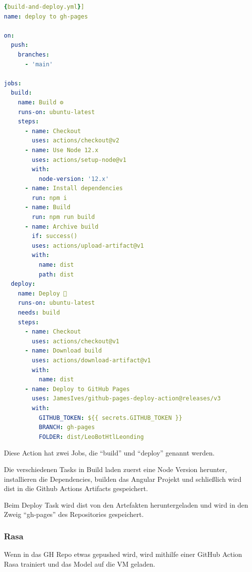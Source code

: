 \begin{lstlisting}[language=yaml,label={lst:buildanddeployyml},caption={build-and-deploy.yml}]{build-and-deploy.yml}]
name: deploy to gh-pages

on:
  push:
    branches:
      - 'main'

jobs:
  build:
    name: Build ⚙
    runs-on: ubuntu-latest
    steps:
      - name: Checkout
        uses: actions/checkout@v2
      - name: Use Node 12.x
        uses: actions/setup-node@v1
        with:
          node-version: '12.x'
      - name: Install dependencies
        run: npm i
      - name: Build
        run: npm run build
      - name: Archive build
        if: success()
        uses: actions/upload-artifact@v1
        with:
          name: dist
          path: dist
  deploy:
    name: Deploy 🚀
    runs-on: ubuntu-latest
    needs: build
    steps:
      - name: Checkout
        uses: actions/checkout@v1
      - name: Download build
        uses: actions/download-artifact@v1
        with:
          name: dist
      - name: Deploy to GitHub Pages
        uses: JamesIves/github-pages-deploy-action@releases/v3
        with:
          GITHUB_TOKEN: ${{ secrets.GITHUB_TOKEN }}
          BRANCH: gh-pages
          FOLDER: dist/LeoBotHtlLeonding
\end{lstlisting}

Diese Action hat zwei Jobs, die ``build'' und ``deploy'' genannt werden.

Die verschiedenen Tasks in Build laden zuerst eine Node Version herunter, installieren die Dependencies, builden das Angular Projekt und schließlich wird dist in die Github Actions Artifacts gespeichert.

Beim Deploy Task wird dist von den Artefakten heruntergeladen und wird in den Zweig ``gh-pages'' des Repositories gespeichert.

\subsubsection{Rasa}

Wenn in das GH Repo etwas gepushed wird, wird mithilfe einer GitHub Action Rasa trainiert und das Model auf die VM geladen.

